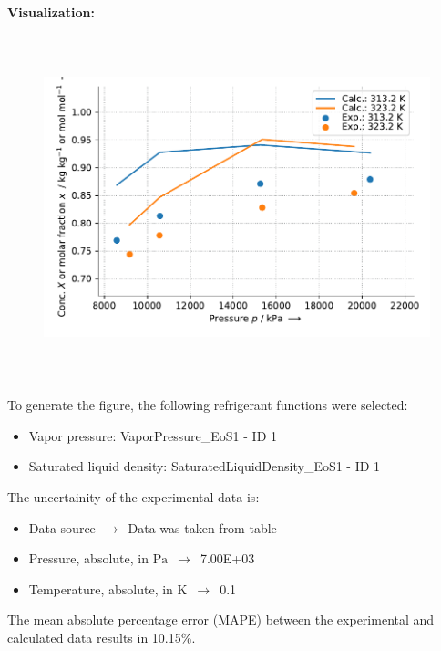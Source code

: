 \textbf{Visualization:}
%
\begin{figure}[!htp]
{\noindent\includegraphics[height=10cm, keepaspectratio]{figs/abs/abs_CarbonDioxide_ionic_liquid_[N4,1,1,1][NTf2]_MixingRule_1.pdf}}
\end{figure}
%

To generate the figure, the following refrigerant functions were selected:
\begin{itemize}
\item Vapor pressure: VaporPressure\_EoS1 - ID 1
\item Saturated liquid density: SaturatedLiquidDensity\_EoS1 - ID 1
\end{itemize}

The uncertainity of the experimental data is:
\begin{itemize}
\item Data source $\,\to\,$ Data was taken from table
\item Pressure, absolute, in $\si{\pascal}$ $\,\to\,$ 7.00E+03
\item Temperature, absolute, in $\si{\kelvin}$ $\,\to\,$ 0.1
\end{itemize}

The mean absolute percentage error (MAPE) between the experimental and calculated data results in 10.15\%.
\FloatBarrier
\newpage
